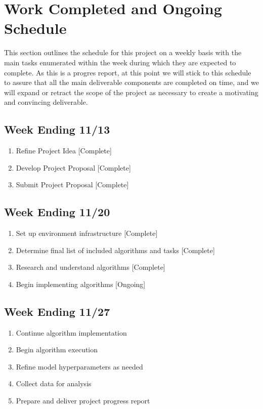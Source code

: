 \documentclass[conference]{IEEEtran}
\begin{document}
\section{Work Completed and Ongoing Schedule} \label{deliverables}
This section outlines the schedule for this project on a weekly basis with the main tasks enumerated within the week during which they are expected to complete.
As this is a progres report, at this point we will stick to this schedule to assure that all the main deliverable components are completed on time, and we will expand or retract the scope of the project as necessary to create a motivating and convincing deliverable.

\subsection{Week Ending 11/13}
\begin{enumerate}
    \item Refine Project Idea [Complete]
    \item Develop Project Proposal [Complete]
    \item Submit Project Proposal [Complete]
\end{enumerate}

\subsection{Week Ending 11/20}
\begin{enumerate}
    \item Set up environment infrastructure [Complete]
    \item Determine final list of included algorithms and tasks [Complete]
    \item Research and understand algorithms [Complete]
    \item Begin implementing algorithms [Ongoing]
\end{enumerate}

\subsection{Week Ending 11/27}
\begin{enumerate}
    \item Continue algorithm implementation
    \item Begin algorithm execution
    \item Refine model hyperparameters as needed
    \item Collect data for analysis
    \item Prepare and deliver project progress report
\end{enumerate}
\end{document}
